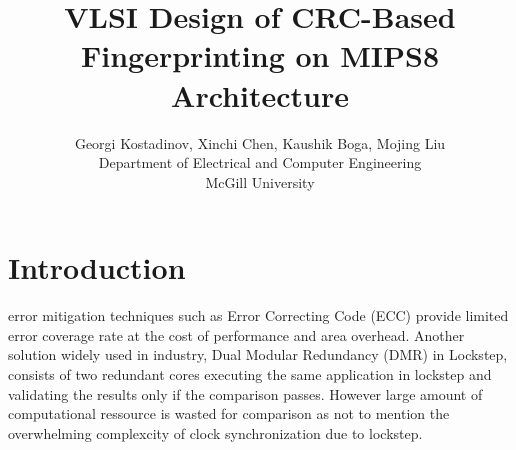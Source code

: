 \documentclass[10pt,journal,compsoc]{IEEEtran}
\begin{document}
\title{VLSI Design of CRC-Based Fingerprinting on MIPS8 Architecture}

\author{Georgi Kostadinov, Xinchi Chen, Kaushik Boga, Mojing Liu
\\Department of Electrical and Computer Engineering 
\\McGill University}






\maketitle






\section{Introduction}
 error mitigation techniques such as Error Correcting Code (ECC) provide limited
error coverage rate at the cost of performance and area overhead. Another solution widely
used in industry,  Dual Modular Redundancy (DMR) in Lockstep, consists of two
redundant cores executing the same application in lockstep and validating the results only if
the comparison passes. However large amount of computational ressource is wasted for comparison
as not to mention the overwhelming complexcity of clock synchronization due to lockstep.
\end{document}
